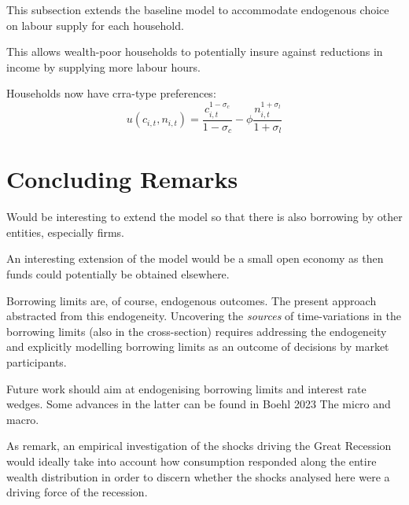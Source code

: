 \documentclass[12pt]{article} %
\numberwithin{equation}{section} %
\begin{document}
This subsection extends the baseline model to accommodate endogenous choice on labour supply for each household.

This allows wealth-poor households to potentially insure against reductions in income by supplying more labour hours.

Households now have \Gls{crra}-type preferences:
\begin{equation}
    u(c_{i,t}, n_{i,t}) = \frac{c_{i,t}^{1-\sigma_c}}{1-\sigma_c} - \phi \frac{n_{i,t}^{1+\sigma_l}}{1+\sigma_l} \label{eq:hh-crra-utility}
\end{equation}

\section{Concluding Remarks}
\label{sec:conclusion}

Would be interesting to extend the model so  that there is also borrowing by other entities, especially firms.

An interesting extension of the model would be a small open economy as then funds could potentially be obtained elsewhere.

Borrowing limits are, of course, endogenous outcomes. The present approach abstracted from this endogeneity. Uncovering the \textit{sources} of time-variations in the borrowing limits (also in the cross-section) requires addressing the endogeneity and explicitly modelling borrowing limits as an outcome of decisions by market participants.

Future work should aim at endogenising borrowing limits and interest rate wedges. Some advances in the latter can be found in Boehl 2023 The micro and macro.

As \textcite{kv2018} remark, an empirical investigation of the shocks driving the  Great Recession would ideally take into account how consumption responded along the entire wealth distribution in order to discern whether the shocks analysed here were a driving force of the recession.

\newpage
\thispagestyle{plain}
\printbibliography[heading=bibintoc] %
\end{document}
